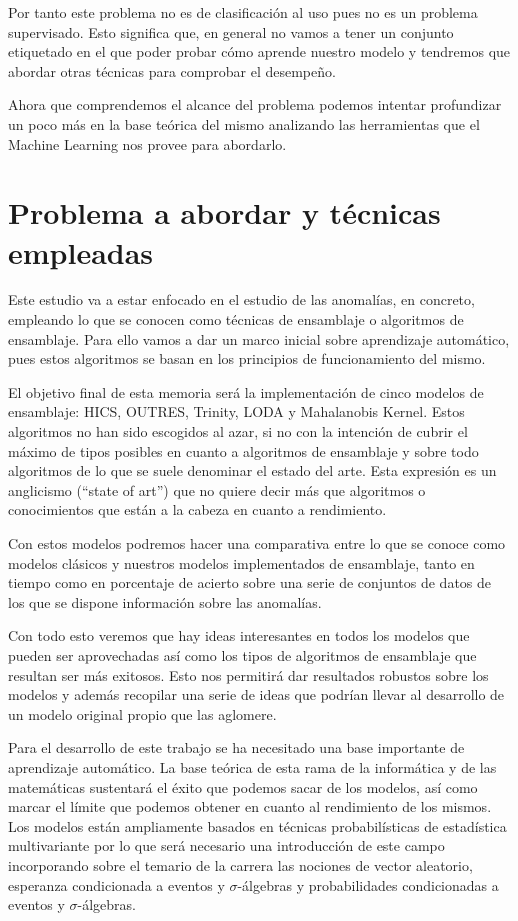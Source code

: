 Por tanto este problema no es de clasificación al uso pues no es un problema supervisado. Esto significa que, en general no vamos a tener un conjunto etiquetado en el que poder probar cómo aprende nuestro modelo y tendremos que abordar otras técnicas para comprobar el desempeño.

Ahora que comprendemos el alcance del problema podemos intentar profundizar un poco más en la base teórica del mismo analizando las herramientas que el Machine Learning nos provee para abordarlo.

\section{Problema a abordar y técnicas empleadas}

Este estudio va a estar enfocado en el estudio de las anomalías, en concreto, empleando lo que se conocen como técnicas de ensamblaje o algoritmos de ensamblaje. Para ello vamos a dar un marco inicial sobre aprendizaje automático, pues estos algoritmos se basan en los principios de funcionamiento del mismo. 

El objetivo final de esta memoria será la implementación de cinco modelos de ensamblaje: HICS, OUTRES, Trinity, LODA y Mahalanobis Kernel. Estos algoritmos no han sido escogidos al azar, si no con la intención de cubrir el máximo de tipos posibles en cuanto a algoritmos de ensamblaje y sobre todo algoritmos de lo que se suele denominar el estado del arte. Esta expresión es un anglicismo (``state of art'') que no quiere decir más que algoritmos o conocimientos que están a la cabeza en cuanto a rendimiento.

Con estos modelos podremos hacer una comparativa entre lo que se conoce como modelos clásicos y nuestros modelos implementados de ensamblaje, tanto en tiempo como en porcentaje de acierto sobre una serie de conjuntos de datos de los que se dispone información sobre las anomalías.

Con todo esto veremos que hay ideas interesantes en todos los modelos que pueden ser aprovechadas así como los tipos de algoritmos de ensamblaje que resultan ser más exitosos. Esto nos permitirá dar resultados robustos sobre los modelos y además recopilar una serie de ideas que podrían llevar al desarrollo de un modelo original propio que las aglomere.

Para el desarrollo de este trabajo se ha necesitado una base importante de aprendizaje automático. La base teórica de esta rama de la informática y de las matemáticas sustentará el éxito que podemos sacar de los modelos, así como marcar el límite que podemos obtener en cuanto al rendimiento de los mismos. Los modelos están ampliamente basados en técnicas probabilísticas de estadística multivariante por lo que será necesario una introducción de este campo incorporando sobre el temario de la carrera las nociones de vector aleatorio, esperanza condicionada a eventos y $\sigma$-álgebras y probabilidades condicionadas a eventos y $\sigma$-álgebras.

